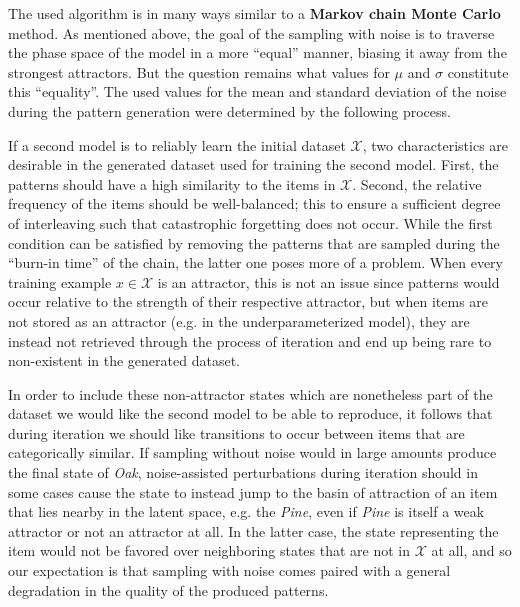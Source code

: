 \documentclass[11pt]{article}
\theoremstyle{remark}
\begin{document}
The used algorithm is in many ways similar to a \textbf{Markov chain Monte Carlo} method. As mentioned above, the goal of the sampling with noise is to traverse the phase space of the model in a more ``equal'' manner, biasing it away from the strongest attractors. But the question remains what values for $\mu$ and $\sigma$ constitute this ``equality''. The used values for the mean and standard deviation of the noise during the pattern generation were determined by the following process.

If a second model is to reliably learn the initial dataset $\mathcal{X}$, two characteristics are desirable in the generated dataset used for training the second model. First, the patterns should have a high similarity to the items in $\mathcal{X}$. Second, the relative frequency of the items should be well-balanced; this to ensure a sufficient degree of interleaving such that catastrophic forgetting does not occur. While the first condition can be satisfied by removing the patterns that are sampled during the ``burn-in time'' of the chain, the latter one poses more of a problem. When every training example $x \in \mathcal{X}$ is an attractor, this is not an issue since patterns would occur relative to the strength of their respective attractor, but when items are not stored as an attractor (e.g. in the underparameterized model), they are instead not retrieved through the process of iteration and end up being rare to non-existent in the generated dataset.

In order to include these non-attractor states which are nonetheless part of the dataset we would like the second model to be able to reproduce, it follows that during iteration we should like transitions to occur between items that are categorically similar. If sampling without noise would in large amounts produce the final state of \textit{Oak}, noise-assisted perturbations during iteration should in some cases cause the state to instead jump to the basin of attraction of an item that lies nearby in the latent space, e.g. the \textit{Pine}, even if \textit{Pine} is itself a weak attractor or not an attractor at all. In the latter case, the state representing the item would not be favored over neighboring states that are not in $\mathcal{X}$ at all, and so our expectation is that sampling with noise comes paired with a general degradation in the quality of the produced patterns.
\end{document}
